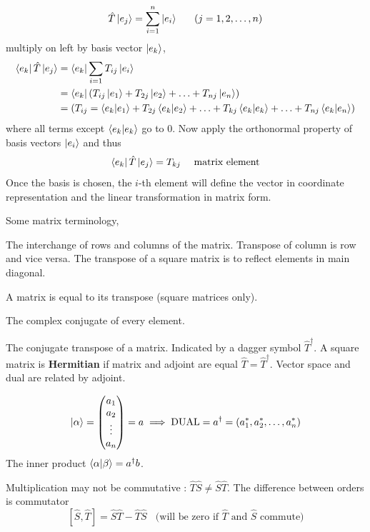 \documentclass[english, 11pt]{article}
\begin{document}
        \[ \hat{T}\left|e_j\right\rangle = \sum_{i=1}^n \left|e_i\right\rangle \ \ \ \ \ (j = 1,2,\ldots,n) \]
        multiply on left by basis vector $\left|e_k\right\rangle$,
        \begin{align*}
          \bra{e_k}\hat{T}\ket{e_j} & = \bra{e_k}\sum_{i = 1}T_{ij}\ket{e_i} \\
          & = \bra{e_k} \left(T_{ij}\ket{e_1} + T_{2j}\ket{e_2} + \ldots + T_{nj} \ket{e_n} \right) \\
          & = \left( T_{ij} = \braket{e_k}{e_1} + T_{2j}\braket{e_k}{e_2} + \ldots + T_{kj}\braket{e_k}{e_k} + \ldots + T_{nj}\braket{e_k}{e_n} \right)
        \end{align*}
        where all terms except $\braket{e_k}{e_k}$ go to 0. Now apply the orthonormal property of basis vectors $\left|e_i\right\rangle$ and thus
        \[ \bra{e_k}\hat{T}\ket{e_j} = T_{kj} \ \ \ \ \mbox{matrix element} \]
        Once the basis is chosen, the $i$-th element will define the vector in coordinate representation and the linear transformation  in matrix form.
        \newline

        Some matrix terminology,

        \begin{defn}[transpose]\label{transpose}
          The interchange of rows and columns of the matrix. Transpose of column is row and vice versa. The transpose of a square matrix is to reflect elements in main diagonal.
        \end{defn}
        \begin{defn}[symmetric]\label{symmetric}
        A matrix is equal to its transpose (square matrices only).
        \end{defn}
        \begin{defn}[conjugate]\label{conjugate}
        The complex conjugate of every element.
        \end{defn}
        \begin{defn}[adjoint]\label{adjoint}
        The conjugate transpose of a matrix. Indicated by a dagger symbol $\hat{T}^\dagger$. A square matrix is \textbf{Hermitian} if matrix and adjoint are equal $\hat{T} = \hat{T}^{\dagger}$. Vector space and dual are related by adjoint.
        \end{defn}
        \[ \left|\alpha\right\rangle = \left(\begin{matrix}a_1 \\ a_2 \\ \vdots \\ a_n\end{matrix}\right) = a \implies \mbox{DUAL} = a^\dagger = (a_1^*, a_2^*,
        \ldots, a_n^*) \]
        The inner product $\braket{\alpha}{\beta} = a^{\dagger}b$.
        \begin{defn}[product]\label{product}
        Multiplication may not be commutative : $\hat{T}\hat{S} \not = \hat{S}\hat{T}$. The difference between orders is commutator
        \[ [\hat{S}, \hat{T}] = \hat{S}\hat{T} - \hat{T}\hat{S} \ \ \ \ \mbox{(will be zero if $\hat{T}$ and $\hat{S}$ commute)} \]
        \end{defn}
\end{document}
